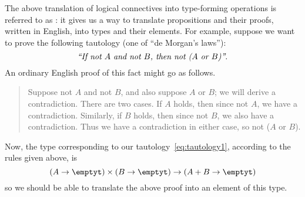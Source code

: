 The above translation of logical connectives into type-forming operations is referred to as : it gives us a way to translate propositions and their proofs, written in English, into types and their elements.
For example, suppose we want to prove the following tautology (one of ``de Morgan's laws''):
%
%
\begin{equation}\label{eq:tautology1}
  \text{\emph{``If not $A$ and not $B$, then not ($A$ or $B$)''}.}
\end{equation}
An ordinary English proof of this fact might go as follows.
\begin{quote}
  Suppose not $A$ and not $B$, and also suppose $A$ or $B$; we will derive a contradiction.
  There are two cases.
  If $A$ holds, then since not $A$, we have a contradiction.
  Similarly, if $B$ holds, then since not $B$, we also have a contradiction.
  Thus we have a contradiction in either case, so not ($A$ or $B$).
\end{quote}
Now, the type corresponding to our tautology~\eqref{eq:tautology1}, according to the rules given above, is
\begin{equation}\label{eq:tautology2}
  (A\to \emptyt) \times (B\to\emptyt) \to (A+B\to\emptyt)
\end{equation}
so we should be able to translate the above proof into an element of this type.

